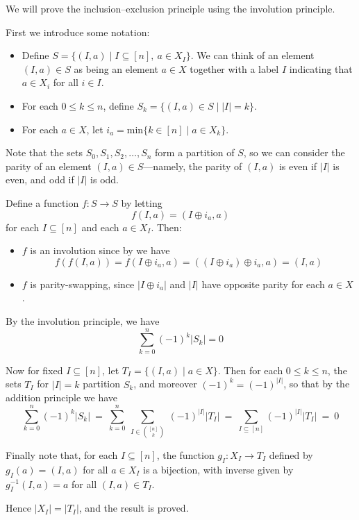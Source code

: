 \begin{cproof}
We will prove the inclusion--exclusion principle using the involution principle.

First we introduce some notation:
\begin{itemize}
\item Define $S = \{ (I, a) \mid I \subseteq [n],~ a \in X_I \}$. We can think of an element $(I, a) \in S$ as being an element $a \in X$ together with a label $I$ indicating that $a \in X_i$ for all $i \in I$.
\item For each $0 \le k \le n$, define $S_k = \{ (I, a) \in S \mid |I| = k \}$.
\item For each $a \in X$, let $i_a = \mathrm{min} \{ k \in [n] \mid a \in X_k \}$.
\end{itemize}

Note that the sets $S_0, S_1, S_2, \dots, S_n$ form a partition of $S$, so we can consider the parity of an element $(I,a) \in S$---namely, the parity of $(I,a)$ is even if $|I|$ is even, and odd if $|I|$ is odd.

Define a function $f : S \to S$ by letting
\[ f(I,a) = (I \oplus i_a, a) \]
for each $I \subseteq [n]$ and each $a \in X_I$. Then:
\begin{itemize}
\item $f$ is an involution since by  we have
\[ f(f(I,a)) = f(I \oplus i_a, a) = ((I \oplus i_a) \oplus i_a, a) = (I, a) \]
\item $f$ is parity-swapping, since $|I \oplus i_a|$ and $|I|$ have opposite parity for each $a \in X$.
\end{itemize}

By the involution principle, we have
\[ \sum_{k=0}^n (-1)^k |S_k| = 0 \]

Now for fixed $I \subseteq [n]$, let $T_I = \{ (I, a) \mid a \in X \}$. Then for each $0 \le k \le n$, the sets $T_I$ for $|I| = k$ partition $S_k$, and moreover $(-1)^k = (-1)^{|I|}$, so that by the addition principle we have
\[ \sum_{k=0}^n (-1)^k |S_k| ~=~ \sum_{k=0}^n ~ \sum_{I \in \binom{[n]}{k}} ~(-1)^{|I|} |T_I| ~=~ \sum_{I \subseteq [n]} (-1)^{|I|} |T_I| ~=~ 0 \]

Finally note that, for each $I \subseteq [n]$, the function $g_I : X_I \to T_I$ defined by $g_I(a) = (I,a)$ for all $a \in X_I$ is a bijection, with inverse given by $g_I^{-1}(I,a) = a$ for all $(I,a) \in T_I$.

Hence $|X_I| = |T_I|$, and the result is proved.
\end{cproof}

